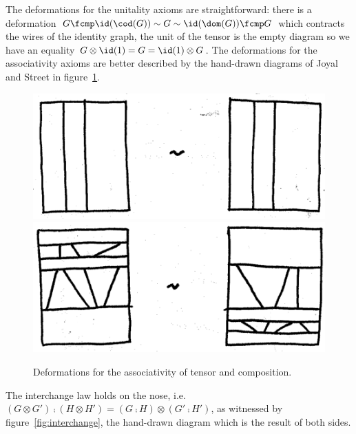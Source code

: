 The deformations for the unitality axioms are straightforward: there is a deformation $G \fcmp \id(\cod(G)) \sim G \sim \id(\dom(G)) \fcmp G$ which contracts the wires of the identity graph, the unit of the tensor is the empty diagram so we have an equality $G \otimes \id(1) = G = \id(1) \otimes G$.
The deformations for the associativity axioms are better described by the hand-drawn diagrams of Joyal and Street in figure~\ref{fig:assoc}.

\begin{figure}[H]
\centering
\includegraphics[scale=0.2]{img/tensor-assoc.png}
\qquad \quad \includegraphics[scale=0.2]{img/compos-assoc.png}
\caption{Deformations for the associativity of tensor and composition.}
\label{fig:assoc}
\end{figure}

The interchange law holds on the nose, i.e. $(G \otimes G') \fcmp (H \otimes H') = (G \fcmp H) \otimes (G' \fcmp H')$, as witnessed by figure~\ref{fig:interchange}, the hand-drawn diagram which is the result of both sides.

